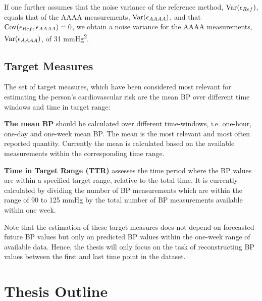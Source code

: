If one further assumes that the noise variance of the reference method,
$\operatorname{Var}(\epsilon_{Ref})$, equals that of the AAAA measurements, $\operatorname{Var}(\epsilon_{AAAA})$,
and that $\operatorname{Cov}(\epsilon_{Ref}, \epsilon_{AAAA})=0$, we obtain a noise variance
for the AAAA measurements,
$\operatorname{Var}(\epsilon_{AAAA})$, of 31 mmHg\textsuperscript{2}.


\subsection{Target Measures}\label{subsec:target-measures}
The set of target measures,
which have been considered most relevant for estimating the person’s cardiovascular risk are
the mean BP over different time windows and time in target range:

\textbf{The mean BP} should be calculated over different time-windows,
i.e. one-hour, one-day and one-week mean BP.
The mean is the most relevant and most often reported quantity.
Currently the mean is calculated based on the available measurements
within the corresponding time range.

\textbf{Time in Target Range (TTR)} assesses the time period where the
BP values are within a specified target range, relative to the total time.
It is currently calculated by dividing the number of BP measurements which are
within the range of 90 to 125 mmHg by the total number of BP measurements
available within one week.

Note that the estimation of these target measures does not depend on
forecasted future BP values but only on predicted BP values within the
one-week range of available data.
Hence, the thesis will only focus on the task of reconstructing BP values
between the first and last time point in the dataset.


\section{Thesis Outline}











